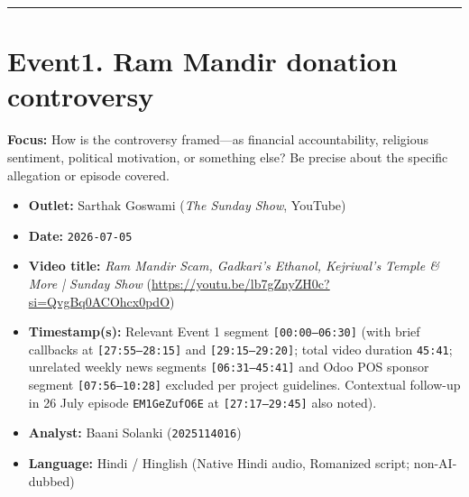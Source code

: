 \documentclass[10pt,a4paper]{article}
\begin{document}
\vspace{4pt}\noindent\rule{\textwidth}{0.4pt}\vspace{4pt}

\section*{Event1. Ram Mandir donation controversy}
\textbf{Focus:} How is the controversy framed---as financial accountability, religious sentiment, political motivation, or something else? Be precise about the specific allegation or episode covered.

\begin{itemize}[leftmargin=1.5em, itemsep=3pt, topsep=4pt]
  \item \textbf{Outlet:} Sarthak Goswami (\textit{The Sunday Show}, YouTube)
  \item \textbf{Date:} \texttt{2026-07-05}
  \item \textbf{Video title:} \textit{Ram Mandir Scam, Gadkari's Ethanol, Kejriwal's Temple \& More | Sunday Show} (\url{https://youtu.be/lb7gZnyZH0c?si=QvgBq0ACOhcx0pdO})
  \item \textbf{Timestamp(s):} Relevant Event 1 segment \texttt{[00:00--06:30]} (with brief callbacks at \texttt{[27:55--28:15]} and \texttt{[29:15--29:20]}; total video duration \texttt{45:41}; unrelated weekly news segments \texttt{[06:31--45:41]} and Odoo POS sponsor segment \texttt{[07:56--10:28]} excluded per project guidelines. Contextual follow-up in 26 July episode \texttt{EM1GeZufO6E} at \texttt{[27:17--29:45]} also noted).
  \item \textbf{Analyst:} Baani Solanki (\texttt{2025114016})
  \item \textbf{Language:} Hindi / Hinglish (Native Hindi audio, Romanized script; non-AI-dubbed)
\end{itemize}
\end{document}
